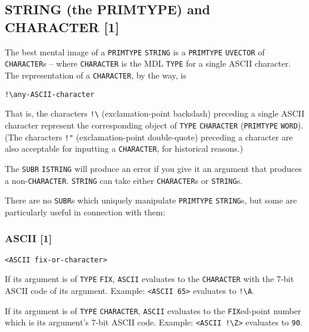 \documentclass[a4paper]{scrbook}
\begin{document}
\subsection{STRING (the PRIMTYPE) and CHARACTER {[}1{]}}\label{string-the-primtype-and-character-1}

The best mental image of a \texttt{PRIMTYPE} \texttt{STRING} is a \texttt{PRIMTYPE}
\texttt{UVECTOR} of \texttt{CHARACTER}s -- where \texttt{CHARACTER} is the MDL
\texttt{TYPE} for a single ASCII character. The representation of a \texttt{CHARACTER}, by the way, is

\begin{verbatim}
!\any-ASCII-character
\end{verbatim}

That is, the characters \texttt{!\textbackslash{}} (exclamation-point backslash) preceding a single ASCII character
represent the corresponding object of \texttt{TYPE} \texttt{CHARACTER} (\texttt{PRIMTYPE} \texttt{WORD}). (The characters
\texttt{!"}  (exclamation-point double-quote) preceding a character are also acceptable for inputting
a \texttt{CHARACTER}, for historical reasons.)

The \texttt{SUBR} \texttt{ISTRING} will produce an error if you give it an argument that produces a
non-\texttt{CHARACTER}. \texttt{STRING} can take either \texttt{CHARACTER}s or \texttt{STRING}s.

There are no \texttt{SUBR}s which uniquely manipulate \texttt{PRIMTYPE} \texttt{STRING}s, but some are particularly useful
in connection with them:

\subsubsection{ASCII {[}1{]}}\label{ascii-1}

\begin{verbatim}
<ASCII fix-or-character>
\end{verbatim}

If its argument is of \texttt{TYPE} \texttt{FIX}, \texttt{ASCII} evaluates to the
\texttt{CHARACTER} with the 7-bit ASCII code of its argument. Example: \texttt{\textless{}ASCII\ 65\textgreater{}}
evaluates to \texttt{!\textbackslash{}A}.

If its argument is of \texttt{TYPE} \texttt{CHARACTER}, \texttt{ASCII} evaluates to the \texttt{FIX}ed-point number which
is its argument's 7-bit ASCII code. Example: \texttt{\textless{}ASCII\ !\textbackslash{}Z\textgreater{}} evaluates to
\texttt{90}.
\end{document}
